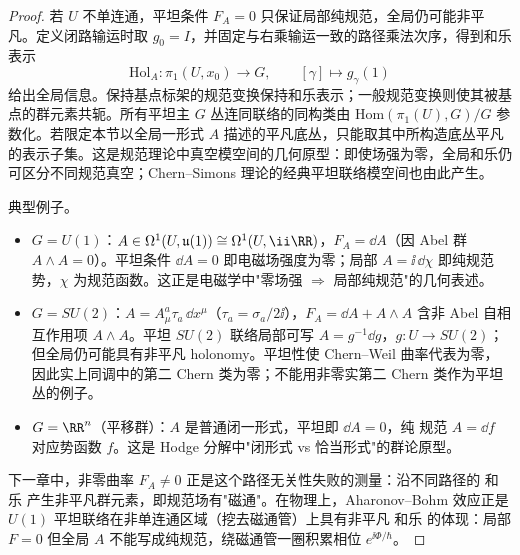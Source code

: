 \begin{proof}
若 $U$ 不单连通，平坦条件 $F_A=0$ 只保证局部纯规范，全局仍可能非平凡。定义闭路输运时取 $g_0=I$，并固定与右乘输运一致的路径乘法次序，得到和乐表示
\begin{equation*}
 \mathrm{Hol}_A:\pi_1(U,x_0)\to G,
 \qquad
 [\gamma]\mapsto g_\gamma(1)
\end{equation*}
给出全局信息。保持基点标架的规范变换保持和乐表示；一般规范变换则使其被基点的群元素共轭。所有平坦主 $G$ 丛连同联络的同构类由 $\mathrm{Hom}(\pi_1(U),G)/G$ 参数化。若限定本节以全局一形式 $A$ 描述的平凡底丛，只能取其中所构造底丛平凡的表示子集。这是规范理论中真空模空间的几何原型：即使场强为零，全局和乐仍可区分不同规范真空；Chern--Simons 理论的经典平坦联络模空间也由此产生。

典型例子。
\begin{itemize}
\item $G=U(1)$：$A\in\Omega^1(U,\mathfrak u(1))\cong\Omega^1(U,\ii\RR)$，$F_A=\dd A$（因 Abel 群 $A\wedge A=0$）。平坦条件 $\dd A=0$ 即电磁场强度为零；局部 $A=\ii\,\dd\chi$ 即纯规范势，$\chi$ 为规范函数。这正是电磁学中"零场强 $\Rightarrow$ 局部纯规范"的几何表述。
\item $G=SU(2)$：$A=A_\mu^a\tau_a\,\dd x^\mu$（$\tau_a=\sigma_a/2\ii$），$F_A=\dd A+A\wedge A$ 含非 Abel 自相互作用项 $A\wedge A$。平坦 $SU(2)$ 联络局部可写 $A=g^{-1}\dd g$，$g:U\to SU(2)$；但全局仍可能具有非平凡 holonomy。平坦性使 Chern--Weil 曲率代表为零，因此实上同调中的第二 Chern 类为零；不能用非零实第二 Chern 类作为平坦丛的例子。
\item $G=\RR^n$（平移群）：$A$ 是普通闭一形式，平坦即 $\dd A=0$，纯 规范 $A=\dd f$ 对应势函数 $f$。这是 Hodge 分解中"闭形式 vs 恰当形式"的群论原型。
\end{itemize}

下一章中，非零曲率 $F_A\neq0$ 正是这个路径无关性失败的测量：沿不同路径的 和乐 产生非平凡群元素，即规范场有"磁通"。在物理上，Aharonov--Bohm 效应正是 $U(1)$ 平坦联络在非单连通区域（挖去磁通管）上具有非平凡 和乐 的体现：局部 $F=0$ 但全局 $A$ 不能写成纯规范，绕磁通管一圈积累相位 $e^{\ii\Phi/\hbar}$。
\end{proof}

